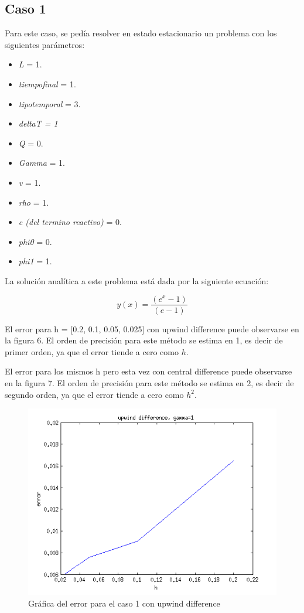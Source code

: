 \documentclass[11pt]{article}
\begin{document}
\subsection{Caso 1}

Para este caso, se ped\'ia resolver en estado estacionario un problema con los siguientes par\'ametros:

\begin{itemize}
	\item \textit{L} = 1.
	\item \textit{tiempofinal} = 1.
    \item \textit{tipotemporal} = 3.
    \item \textit{deltaT = 1}
    \item \textit{Q} = 0.
    \item \textit{Gamma} = 1.
    \item \textit{v} = 1.
    \item \textit{rho} = 1.
    \item \textit{c (del termino reactivo)} = 0.
    \item \textit{phi0} = 0.
    \item \textit{phi1} = 1.
\end{itemize}

\bigskip La soluci\'on anal\'itica a este problema est\'a dada por la siguiente ecuaci\'on:

\begin{equation}
y(x) = \frac{(e^x-1)}{(e-1)}
\end{equation}

\bigskip El error para h = [0.2, 0.1, 0.05, 0.025] con upwind difference puede observarse en la figura 6. El orden de precisi\'on para este m\'etodo se estima en 1, es decir de primer orden, ya que el error tiende a cero como $h$. 

\bigskip El error para los mismos h pero esta vez con central difference puede observarse en la figura 7.  El orden de precisi\'on para este m\'etodo se estima en 2, es decir de segundo orden, ya que el error tiende a cero como $h^2$.

\begin{figure}[tbh]
	\centering
		\includegraphics[width=1.0\textwidth]{imagen6.png}
	\caption{Gr\'afica del error para el caso 1 con upwind difference}
	\label{fig:Fig1}
\end{figure}
\end{document}
